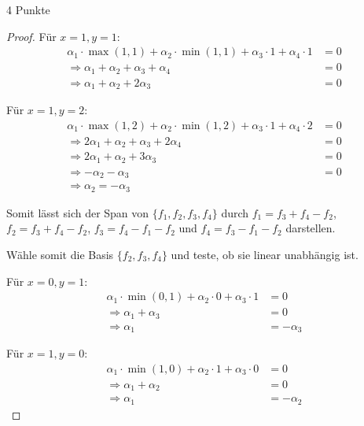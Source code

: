 \documentclass{problemset}
\begin{document}
\begin{problem}{4 Punkte}
\begin{proof}
    Für $x = 1, y = 1$:
    \begin{align*}
        \alpha_1 \cdot \max(1, 1) + \alpha_2 \cdot \min(1, 1) + \alpha_3 \cdot 1 + \alpha_4 \cdot 1 & = 0 \\
        \Rightarrow \alpha_1 + \alpha_2 + \alpha_3 + \alpha_4                                       & = 0 \\
        \Rightarrow \alpha_1 + \alpha_2 + 2 \alpha_3                                                & = 0
    \end{align*}

    Für $x = 1, y = 2$:
    \begin{align*}
        \alpha_1 \cdot \max(1, 2) + \alpha_2 \cdot \min(1, 2) + \alpha_3 \cdot 1 + \alpha_4 \cdot 2 & = 0 \\
        \Rightarrow 2\alpha_1 + \alpha_2 + \alpha_3 + 2\alpha_4                                     & = 0 \\
        \Rightarrow 2\alpha_1 + \alpha_2 + 3 \alpha_3                                               & = 0 \\
        \Rightarrow -\alpha_2 - \alpha_3                                                            & = 0 \\
        \Rightarrow \alpha_2 = - \alpha_3
    \end{align*}

    Somit lässt sich der Span von $\{f_1, f_2, f_3, f_4\}$ durch $f_1 = f_3 + f_4 -
        f_2$, $f_2 = f_3 + f_4 - f_2$, $f_3 = f_4 - f_1 - f_2$ und $f_4 = f_3 - f_1 -
        f_2$ darstellen.

    Wähle somit die Basis $\{f_2, f_3, f_4\}$ und teste, ob sie linear unabhängig
    ist.

    Für $x = 0, y = 1$:
    \begin{align*}
        \alpha_1 \cdot \min(0, 1) + \alpha_2 \cdot 0 + \alpha_3 \cdot 1 & = 0         \\
        \Rightarrow \alpha_1 + \alpha_3                                 & = 0         \\
        \Rightarrow \alpha_1                                            & = -\alpha_3
    \end{align*}

    Für $x = 1, y = 0$:
    \begin{align*}
        \alpha_1 \cdot \min(1, 0) + \alpha_2 \cdot 1 + \alpha_3 \cdot 0 & = 0         \\
        \Rightarrow \alpha_1 + \alpha_2                                 & = 0         \\
        \Rightarrow \alpha_1                                            & = -\alpha_2
    \end{align*}


\end{proof}
\end{problem}
\end{document}
